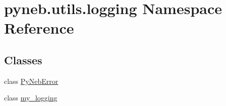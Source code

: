 \hypertarget{namespacepyneb_1_1utils_1_1logging}{\section{pyneb.\-utils.\-logging Namespace Reference}
\label{namespacepyneb_1_1utils_1_1logging}
}
\subsection*{Classes}
\begin{DoxyCompactItemize}
\item 
class \hyperlink{classpyneb_1_1utils_1_1logging_1_1_py_neb_error}{Py\-Neb\-Error}
\item 
class \hyperlink{classpyneb_1_1utils_1_1logging_1_1my__logging}{my\-\_\-logging}
\end{DoxyCompactItemize}

